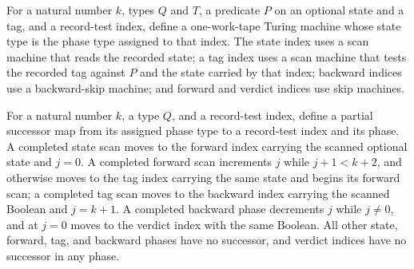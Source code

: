 \begin{definition}
\label{Turing.recordTestRows}
\leanok
{}
For a natural number $k$, types $Q$ and $T$, a predicate $P$ on an optional state and a
tag, and a record-test index, define a one-work-tape Turing machine whose state type is
the phase type assigned to that index. The state index uses a scan machine that reads
the recorded state; a tag index uses a scan machine that tests the recorded tag against
$P$ and the state carried by that index; backward indices use a backward-skip machine;
and forward and verdict indices use skip machines.
\end{definition}

\begin{definition}
\label{Turing.recordTestNext}
\leanok
{}
For a natural number $k$, a type $Q$, and a record-test index, define a partial
successor map from its assigned phase type to a record-test index and its phase. A
completed state scan moves to the forward index carrying the scanned optional state and
$j=0$. A completed forward scan increments $j$ while $j+1<k+2$, and otherwise moves to
the tag index carrying the same state and begins its forward scan; a completed tag scan
moves to the backward index carrying the scanned Boolean and $j=k+1$. A completed
backward phase decrements $j$ while $j\ne0$, and at $j=0$ moves to the verdict index
with the same Boolean. All other state, forward, tag, and backward phases have no
successor, and verdict indices have no successor in any phase.
\end{definition}

